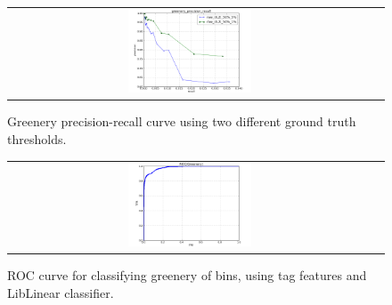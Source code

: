 \begin{figure}
\begin{center}
\begin{tabular}{cc}
\includegraphics[width=0.35\textwidth]{plots/greenery.png}
\end{tabular}
\end{center}
\vspace{-12pt}
\caption{Greenery precision-recall curve using two different ground truth thresholds.}
\label{fig:greenery}
\end{figure}

\begin{figure}
\begin{center}
\begin{tabular}{cc}
\includegraphics[width=0.35\textwidth]{plots/greenery_LibLinear_Snow_1_curves_ROC.png}
\end{tabular}
\end{center}
\vspace{-12pt}
\caption{ROC curve for classifying greenery of bins, using tag features and LibLinear classifier.}
\label{fig:liblinear_greenery}
\end{figure}
\vspace{-12pt}







